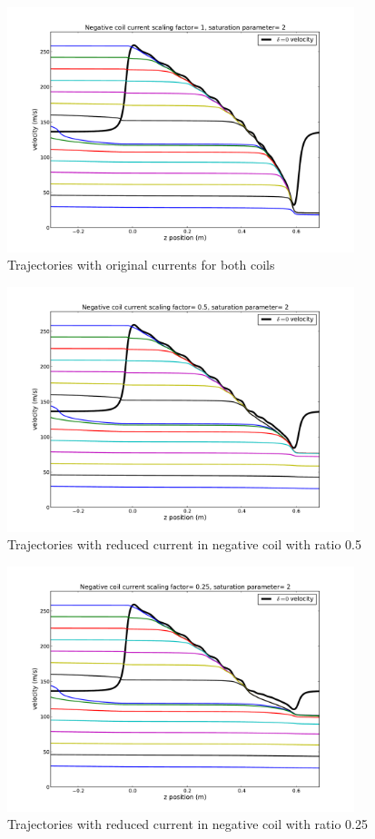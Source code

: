 \documentclass[12pt,a4paper]{article}
\begin{document}
\begin{figure}[htb]
\centering
\includegraphics[width=0.9\textwidth]{trajectory03_1}
\caption{Trajectories with original currents for both coils}
\label{fig:trajectory1}
\end{figure}

\begin{figure}[htb]
\centering
\includegraphics[width=0.9\textwidth]{trajectory03_2}
\caption{Trajectories with reduced current in negative coil with ratio 0.5}
\label{fig:trajectory2}
\end{figure}

\begin{figure}[htb]
\centering
\includegraphics[width=0.9\textwidth]{trajectory03_3}
\caption{Trajectories with reduced current in negative coil with ratio 0.25}
\label{fig:trajectory3}
\end{figure}
\end{document}
